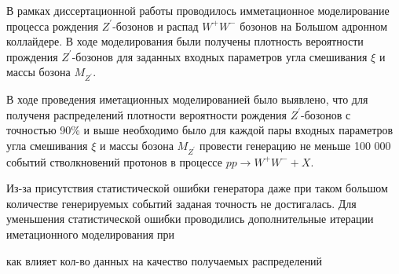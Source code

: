 В рамках диссертационной работы проводилось имметационное моделирование процесса рождения ${Z}^{\prime}$-бозонов и распад ${W}^{+}{W}^{-}$ бозонов на Большом адронном коллайдере. В ходе моделирования были получены плотность вероятности прождения ${Z}^{\prime}$-бозонов для заданных входных параметров угла смешивания $\xi$ и массы бозона ${M}_{{Z}^{\prime}}$.

В ходе проведения иметационных моделированией было выявлено, что для полученя распределений плотности вероятности рождения ${Z}^{\prime}$-бозонов с точностью 90\% и выше необходимо было для каждой пары входных параметров угла смешивания $\xi$ и массы бозона ${M}_{{Z}^{\prime}}$ провести генерацию не меньше 100 000 событий стволкновений протонов в процессе $pp \rightarrow W^+W^- + X$. 

Из-за присутствия статистической ошибки генератора даже при таком большом количестве генерируемых событий заданая точность не достигалась. Для уменьшения статистической ошибки проводились дополнительные итерации иметационного моделирования при 

как влияет кол-во данных на качество получаемых распределений